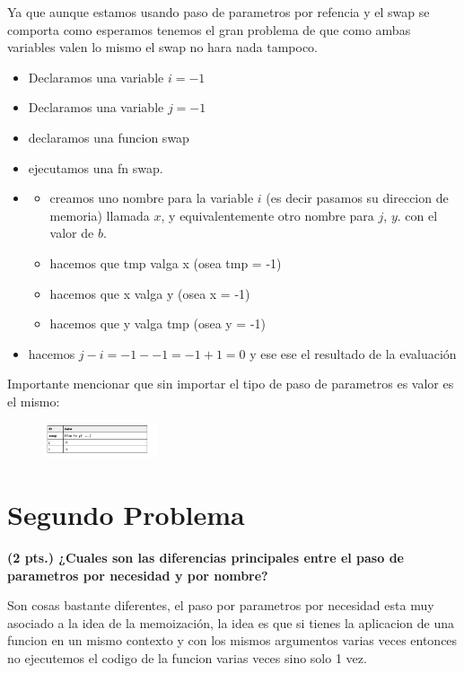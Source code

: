 \documentclass[journal,12pt,onecolumn]{IEEEtran}                %
\theoremstyle{break}                                            %
\begin{document}
\begin{itemize}
      Ya que aunque estamos usando paso de parametros por refencia y el swap se comporta como esperamos
      tenemos el gran problema de que como ambas variables valen lo mismo el swap no hara nada tampoco.
        \begin{itemize}
          \item Declaramos una variable $i = -1$
          \item Declaramos una variable $j = -1$
          \item declaramos una funcion swap
          \item ejecutamos una fn swap.
          \item 
          \begin{itemize}
            \item creamos uno nombre para la variable $i$ (es decir pasamos su direccion de memoria) 
            llamada $x$, y equivalentemente otro nombre para $j$, $y$. 
            con el valor de $b$.
            \item hacemos que tmp valga x (osea tmp = -1)
            \item hacemos que x valga y (osea x = -1)
            \item hacemos que y valga tmp (osea y = -1)
          \end{itemize}
          \item hacemos $j - i = -1 - -1 = -1 + 1 = 0$ y ese ese el resultado de la evaluación
        \end{itemize}
      \end{itemize}

      Importante mencionar que sin importar el tipo de paso de parametros es valor es el mismo:
      \begin{figure}[h]
        \includegraphics[width=0.3\textwidth]{pila}
      \end{figure}

    \section*{Segundo Problema}

      \textbf{(2 pts.) ¿Cuales son las diferencias 
      principales entre el paso de parametros por necesidad y por nombre?}

      Son cosas bastante diferentes, el paso por parametros por necesidad esta muy asociado a la idea
      de la memoización, la idea es que si tienes la aplicacion de una funcion en un mismo contexto y con los mismos argumentos
      varias veces entonces no ejecutemos el codigo de la funcion varias veces sino solo 1 vez.
      
\end{document}
